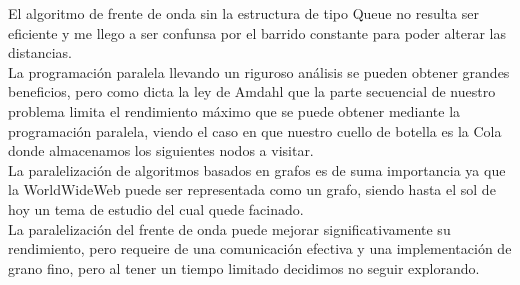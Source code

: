 \documentclass[oneside,twocolumn]{article}
\begin{document}
El algoritmo de frente de onda sin la estructura de tipo Queue no resulta ser eficiente y me llego a ser confunsa por el barrido constante para poder alterar las distancias.\\

La programación paralela llevando un riguroso análisis se pueden obtener grandes beneficios, pero como dicta la ley de Amdahl que la parte secuencial de nuestro problema limita el rendimiento máximo que se puede obtener mediante la programación paralela, viendo el caso en que nuestro cuello de botella es la Cola donde almacenamos los siguientes nodos a visitar.\\

La paralelización de algoritmos basados en grafos es de suma importancia ya que la WorldWideWeb puede ser representada como un grafo, siendo hasta el sol de hoy un tema de estudio del cual quede facinado.\\

La paralelización del frente de onda puede mejorar significativamente su rendimiento, pero requeire de una comunicación efectiva y una implementación de grano fino, pero al tener un tiempo limitado decidimos no seguir explorando.
\end{document}

